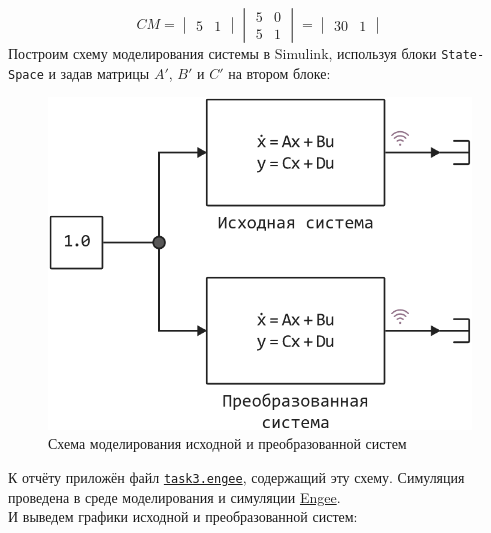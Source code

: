 \documentclass[a4paper]{article}
\begin{document}
$$CM = \begin{vmatrix}
    5 & 1
\end{vmatrix}\begin{vmatrix}
    5 & 0 \\ 5 & 1
\end{vmatrix} = \begin{vmatrix}
    30 & 1
\end{vmatrix}$$\newpage
Построим схему моделирования системы в Simulink, используя блоки \texttt{State-Space} и задав матрицы $A'$, $B'$ и $C'$ на втором блоке:
\begin{figure}[H]
    \centering
    \includegraphics[height=0.23\textheight]{sources/task3_model.png}
    \caption*{Схема моделирования исходной и преобразованной систем}
\end{figure}
К отчёту приложён файл \href{run:sources}{\texttt{task3.engee}}, содержащий эту схему. Симуляция проведена в среде моделирования и симуляции \href{https://start.engee.com/}{Engee}.\\[0.5em]
И выведем графики исходной и преобразованной систем:
\end{document}
